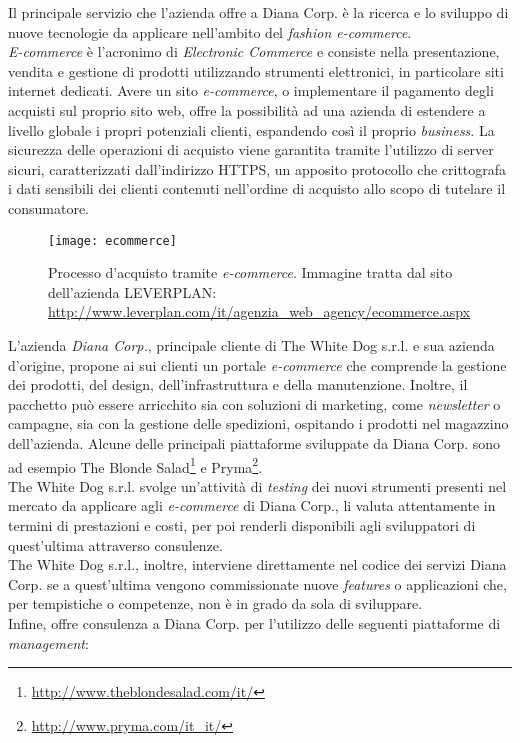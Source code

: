 Il principale servizio che l'azienda offre a Diana Corp. è la ricerca e lo sviluppo di nuove tecnologie da applicare nell'ambito del \textit{fashion e-commerce}. \\
\textit{E-commerce} è l'acronimo di \textit{Electronic Commerce} e consiste nella presentazione, vendita e gestione di prodotti utilizzando strumenti elettronici, in particolare siti internet dedicati. Avere un sito \textit{e-commerce}, o implementare il pagamento degli acquisti sul proprio sito web, offre la possibilità ad una azienda di estendere a livello globale i propri potenziali clienti, espandendo così il proprio \textit{business}. La sicurezza delle operazioni di acquisto viene garantita tramite l'utilizzo di server sicuri, caratterizzati dall'indirizzo HTTPS, un apposito protocollo che crittografa i dati sensibili dei clienti contenuti nell'ordine di acquisto allo scopo di tutelare il consumatore.

\label{E-commerce}
\begin{figure}[ht]
	\begin{center}
		\texttt{[image: ecommerce]}
		\caption{Processo d'acquisto tramite \textit{e-commerce}. Immagine tratta dal sito dell'azienda LEVERPLAN: \url{http://www.leverplan.com/it/agenzia_web_agency/ecommerce.aspx}}
	\end{center}
\end{figure}
\FloatBarrier

L'azienda \textit{Diana Corp.}, principale cliente di The White Dog s.r.l. e sua azienda d'origine, propone ai sui clienti un portale \textit{e-commerce} che comprende la gestione dei prodotti, del design, dell'infrastruttura e della manutenzione. Inoltre, il pacchetto può essere arricchito sia con soluzioni di marketing, come \textit{newsletter} o campagne, sia con la gestione delle spedizioni, ospitando i prodotti nel magazzino dell'azienda. Alcune delle principali piattaforme sviluppate da Diana Corp. sono ad esempio The Blonde Salad\footnote[3]{\url{http://www.theblondesalad.com/it/}} e Pryma\footnote[4]{\url{http://www.pryma.com/it_it/}}. \\
The White Dog s.r.l. svolge un'attività di \textit{testing} dei nuovi strumenti presenti nel mercato da applicare agli \textit{e-commerce} di Diana Corp., li valuta attentamente in termini di prestazioni e costi, per poi renderli disponibili agli sviluppatori di quest'ultima attraverso consulenze. \\
The White Dog s.r.l., inoltre, interviene direttamente nel codice dei servizi Diana Corp. se a quest'ultima vengono commissionate nuove \textit{features} o applicazioni che, per tempistiche o competenze, non è in grado da sola di sviluppare. \\
Infine, offre consulenza a Diana Corp. per l'utilizzo delle seguenti piattaforme di \textit{management}:

